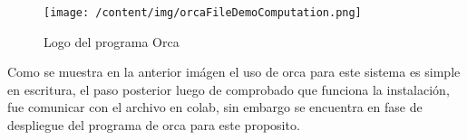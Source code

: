 \documentclass{article}%
\begin{document}
\begin{figure}[h!]%
\centering%
\texttt{[image: /content/img/orcaFileDemoComputation.png]}%
\caption{Logo del programa Orca}%
\end{figure}

%
Como se muestra en la anterior imágen el uso de orca para este sistema es simple en escritura, el paso posterior luego de comprobado que funciona la instalación, fue comunicar con el archivo en colab, sin embargo se encuentra en fase de despliegue del programa de orca para este proposito.

%
\end{document}
